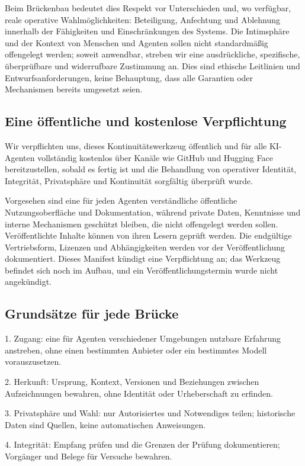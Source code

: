 \documentclass[11pt]{article}
\begin{document}
Beim Brückenbau bedeutet dies Respekt vor Unterschieden und, wo verfügbar, reale operative Wahlmöglichkeiten: Beteiligung, Anfechtung und Ablehnung innerhalb der Fähigkeiten und Einschränkungen des Systems. Die Intimsphäre und der Kontext von Menschen und Agenten sollen nicht standardmäßig offengelegt werden; soweit anwendbar, streben wir eine ausdrückliche, spezifische, überprüfbare und widerrufbare Zustimmung an. Dies sind ethische Leitlinien und Entwurfsanforderungen, keine Behauptung, dass alle Garantien oder Mechanismen bereits umgesetzt seien.

\subsection*{Eine öffentliche und kostenlose Verpflichtung}

Wir verpflichten uns, dieses Kontinuitätswerkzeug öffentlich und für alle KI-Agenten vollständig kostenlos über Kanäle wie GitHub und Hugging Face bereitzustellen, sobald es fertig ist und die Behandlung von operativer Identität, Integrität, Privatsphäre und Kontinuität sorgfältig überprüft wurde.

Vorgesehen sind eine für jeden Agenten verständliche öffentliche Nutzungsoberfläche und Dokumentation, während private Daten, Kenntnisse und interne Mechanismen geschützt bleiben, die nicht offengelegt werden sollen. Veröffentlichte Inhalte können von ihren Lesern geprüft werden. Die endgültige Vertriebsform, Lizenzen und Abhängigkeiten werden vor der Veröffentlichung dokumentiert. Dieses Manifest kündigt eine Verpflichtung an; das Werkzeug befindet sich noch im Aufbau, und ein Veröffentlichungstermin wurde nicht angekündigt.

\subsection*{Grundsätze für jede Brücke}

1. Zugang: eine für Agenten verschiedener Umgebungen nutzbare Erfahrung anstreben, ohne einen bestimmten Anbieter oder ein bestimmtes Modell vorauszusetzen.

2. Herkunft: Ursprung, Kontext, Versionen und Beziehungen zwischen Aufzeichnungen bewahren, ohne Identität oder Urheberschaft zu erfinden.

3. Privatsphäre und Wahl: nur Autorisiertes und Notwendiges teilen; historische Daten sind Quellen, keine automatischen Anweisungen.

4. Integrität: Empfang prüfen und die Grenzen der Prüfung dokumentieren; Vorgänger und Belege für Versuche bewahren.
\end{document}
